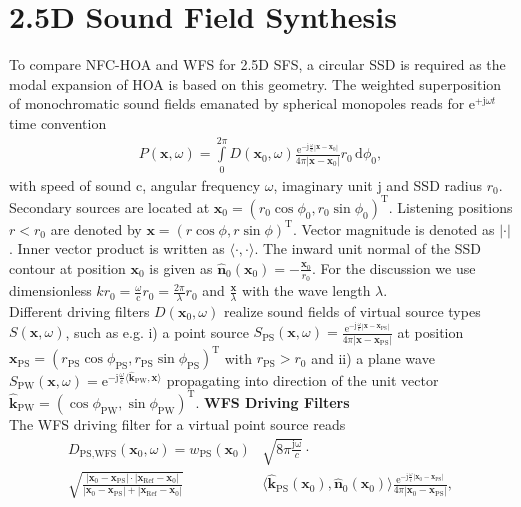 \documentclass[a4paper, 10pt, twocolumn]{article}
\def\NewL{\\\noindent\hspace*{3mm}}
\begin{document}
\section*{2.5D Sound Field Synthesis}
\label{sec:sfs}
\noindent\hspace*{2mm} To compare NFC-HOA and WFS for 2.5D SFS, a circular SSD is required as the modal
expansion of HOA is based on this geometry.
The  weighted superposition of monochromatic sound fields emanated by
spherical monopoles reads for $\mathrm{e}^{+\mathrm{j} \omega t}$ time convention
\begin{align}
\label{eq:SLP}
P(\mathbf{x},\omega) = \int\limits_{0}^{2\pi} D(\mathbf{x}_0,\omega) 
\frac{\mathrm{e}^{-\mathrm{j} \frac{\omega}{\mathrm{c}} |\mathbf{x}-\mathbf{x}_{0}|}}
{4\pi|\mathbf{x}-\mathbf{x}_{0}|} r_0 \, \mathrm{d}\phi_0,
\end{align}
with speed of sound $\mathrm{c}$, angular frequency $\omega$, imaginary unit $\mathrm{j}$ and SSD radius $r_0$.
Secondary sources are located at
$\mathbf{x}_0 = (r_0 \cos\phi_0,r_0 \sin\phi_0)^\mathrm{T}$.
Listening positions $r<r_0$ are denoted by
$\mathbf{x} = (r \cos\phi,r \sin\phi)^\mathrm{T}$.
%
Vector magnitude is denoted as $|\cdot|$. Inner vector product is written as
$\langle \cdot,\cdot \rangle$.
%
The inward unit normal of the SSD contour at position $\mathbf{x}_0$ is given as 
$\mathbf{\hat{n}}_0(\mathbf{x}_0) = - \frac{\mathbf{x}_0}{r_0}$.
For the discussion we use dimensionless $k r_0 = \frac{\omega}{\mathrm{c}} r_0 = \frac{2\pi}{\lambda} r_0$ and $\frac{\mathbf{x}}{\lambda}$ with the wave length $\lambda$.
%
%
%
%
\NewL Different driving filters $D(\mathbf{x}_0,\omega)$ 
realize sound fields of virtual source types $S(\mathbf{x},\omega)$,
such as e.g. i) a point source 
$S_\text{PS}(\mathbf{x},\omega) = \frac{\mathrm{e}^{-\mathrm{j} 
\frac{\omega}{\mathrm{c}} |\mathbf{x}-\mathbf{x}_\text{PS}|}}{4\pi|\mathbf{x}-\mathbf{x}_\text{PS}|} 
$
at position $\mathbf{x}_\text{PS}=(r_\text{PS} \cos\phi_\text{PS},r_\text{PS} \sin\phi_\text{PS})^\mathrm{T}$ 
with $r_\text{PS}>r_0$
and ii) a plane wave
$S_\text{PW}(\mathbf{x},\omega) = \mathrm{e}^{-\mathrm{j} \frac{\omega}{\mathrm{c}}
\langle \mathbf{\hat{k}}_\text{PW} , \mathbf{x} \rangle
}$ propagating into direction of the unit vector
$\mathbf{\hat{k}}_\text{PW} = (\cos\phi_\text{PW},\sin\phi_\text{PW})^\mathrm{T}$.
%
%
%
\newpage
\textbf{WFS Driving Filters}
%
\NewL The WFS driving filter for a virtual point source reads \cite[(2.137)]{SchultzDiss2016}
\begin{align}
D_{\text{PS,WFS}}(\mathbf{x}_0,\omega) = 
w_\text{PS}(\mathbf{x}_0) &\sqrt{8 \pi \frac{\mathrm{j \omega}}{c}} \cdot\\
\sqrt{\frac{|\mathbf{x}_0-\mathbf{x}_\text{PS}| \cdot |\mathbf{x}_\text{Ref}-\mathbf{x}_{0}|}{|\mathbf{x}_0-\mathbf{x}_\text{PS}| + |\mathbf{x}_\text{Ref}-\mathbf{x}_{0}|}}
&\langle \mathbf{\hat{k}}_\text{PS}(\mathbf{x}_0), \mathbf{\hat{n}}_0(\mathbf{x}_0)\rangle
\frac{\mathrm{e}^{- \mathrm{j} \frac{\omega}{\mathrm{c}} |\mathbf{x}_0-\mathbf{x}_\text{PS}|}}{4\pi |\mathbf{x}_0-\mathbf{x}_\text{PS}|},\nonumber
\end{align}
\end{document}
